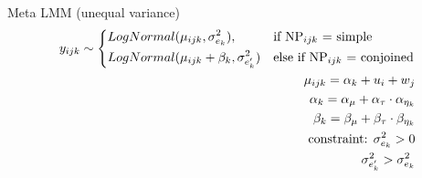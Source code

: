 \begin{frame}[fragile]{Meta LMM (unequal variance)}
	\begin{equation*}
		\begin{aligned}
		y_{ijk} \sim
			\begin{dcases*} 
				LogNormal(\mu_{ijk}, \sigma_{e_k}^2), &  if NP$_{ijk}$ = simple\\
				LogNormal(\mu_{ijk} + \beta_k, \sigma_{e'_k}^2) & else if NP$_{ijk}$ = conjoined\\
			\end{dcases*}\\
		\mu_{ijk} = \alpha_k + u_i + w_j\\
		\alpha_k = \alpha_{\mu} + \alpha_{\tau} \cdot \alpha_{\eta_k}\\
		\beta_k = \beta_{\mu} + \beta_{\tau} \cdot \beta_{\eta_k}\\
		\text{constraint: }\sigma_{e_k}^2>0\\
		\sigma_{e'_k}^2 > \sigma_{e_k}^2
		\end{aligned}
	\end{equation*}
	
	
\end{frame}


\begin{comment}
\begin{frame}{Predictions}

\begin{itemize}
	\uncover<-1>	{\item Standard analysis (LMM): Conjoined NPs cause a systematic slowdown in onset latencies, implying that phrase syntax is obligated by the production system.}
	\uncover<2>	{\item Alternative analysis (MoG): Conjoined NPs show a larger probability for longer onset latencies which, however, remain the minority; hence, preplanning syntax is not obligated by the production system.}
\end{itemize}

\end{frame}
\end{comment}



